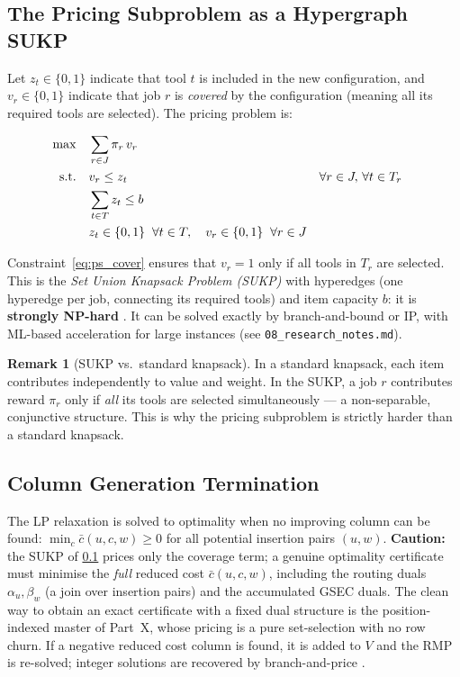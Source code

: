 \documentclass[11pt,a4paper]{article}
\theoremstyle{plain}
\theoremstyle{definition}
\newtheorem{remark}[theorem]{Remark}
\begin{document}
\subsection{The Pricing Subproblem as a Hypergraph SUKP}
\label{sec:sukp}

Let $z_t \in \{0,1\}$ indicate that tool $t$ is included in the new configuration,
and $v_r \in \{0,1\}$ indicate that job $r$ is \emph{covered} by the configuration
(meaning all its required tools are selected). The pricing problem is:

\begin{align}
\max \quad & \sum_{r \in J} \pi_r\, v_r \label{eq:ps_obj}\\
\text{s.t.}\quad
& v_r \le z_t && \forall r \in J,\, \forall t \in T_r \label{eq:ps_cover}\\
& \sum_{t \in T} z_t \le b \label{eq:ps_cap}\\
& z_t \in \{0,1\} \;\; \forall t \in T, \quad v_r \in \{0,1\} \;\; \forall r \in J
  \notag
\end{align}

Constraint~\eqref{eq:ps_cover} ensures that $v_r=1$ only if all tools in $T_r$
are selected. This is the \emph{Set Union Knapsack Problem (SUKP)} with hyperedges
(one hyperedge per job, connecting its required tools) and item capacity $b$:
it is \textbf{strongly NP-hard} \cite{Goldschmidt1994}. It can be solved exactly
by branch-and-bound or IP, with ML-based acceleration for large instances
(see \texttt{08\_research\_notes.md}).

\begin{remark}[SUKP vs.\ standard knapsack]
In a standard knapsack, each item contributes independently to value and weight.
In the SUKP, a job $r$ contributes reward $\pi_r$ only if \emph{all} its tools
are selected simultaneously — a non-separable, conjunctive structure. This is
why the pricing subproblem is strictly harder than a standard knapsack.
\end{remark}

\subsection{Column Generation Termination}

The LP relaxation is solved to optimality when no improving column can be found:
$\min_{c} \bar{c}(u,c,w) \ge 0$ for all potential insertion pairs $(u,w)$.
\textbf{Caution:} the SUKP of \cref{sec:sukp} prices only the coverage term; a
genuine optimality certificate must minimise the \emph{full} reduced cost
$\bar c(u,c,w)$, including the routing duals $\alpha_u,\beta_w$ (a join over
insertion pairs) and the accumulated GSEC duals. The clean way to obtain an exact
certificate with a fixed dual structure is the position-indexed master of Part~X,
whose pricing is a pure set-selection with no row churn. If a negative reduced
cost column is found, it is added to $V$ and the RMP is re-solved; integer
solutions are recovered by branch-and-price \cite{Barnhart1998}.
\end{document}
